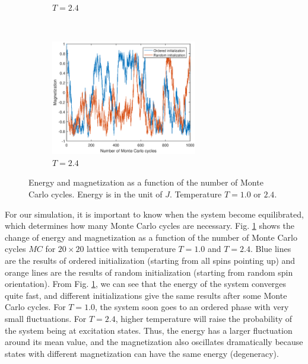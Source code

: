 \begin{figure}[tb]
\begin{subfigure}[tb]{0.5\textwidth}
		\caption{$T=2.4$}
	\end{subfigure}
	~
	\begin{subfigure}[tb]{0.5\textwidth}
		\centering
		\includegraphics[width=0.7\textwidth]{Process_mag_highT.eps}		
		\caption{$T=2.4$}
	\end{subfigure}
	\caption{Energy and magnetization as a function of the number of Monte Carlo cycles. 
	Energy is in the unit of $J$. Temperature $T=1.0$ or $2.4$. }
	\label{fig:process}
\end{figure}
For our simulation, it is important to know when the system become equilibrated, 
which determines how many Monte Carlo cycles are necessary. 
Fig. \ref{fig:process} shows the change of energy and magnetization as a function of the number of Monte Carlo cycles $MC$ 
for $20 \times 20$ lattice with temperature $T=1.0$ and $T=2.4$. 
Blue lines are the results of ordered initialization (starting from all spins pointing up) 
and orange lines are the results of random initialization (starting from random spin orientation). 
From Fig. \ref{fig:process}, we can see that the energy of the system converges quite fast, 
and different initializations give the same results after some Monte Carlo cycles. 
For $T=1.0$, the system soon goes to an ordered phase with very small fluctuations. 
For $T=2.4$, higher temperature will raise the probability of the system being at excitation states. 
Thus, the energy has a larger fluctuation around its mean value, 
and the magnetization also oscillates dramatically 
because states with different magnetization can have the same energy (degeneracy). 
\par

